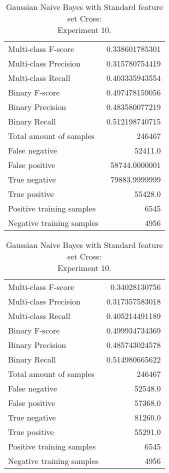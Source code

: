\begin{table}[H]
\begin{minipage}{0.5\textwidth}
\caption{Gaussian Naive Bayes with Standard feature set Cross: \\Experiment 9.}
\centering
\begin{tabular}{l r}
\toprule
Multi-class F-score & 0.338601785301 \\
Multi-class Precision & 0.315780754419 \\
Multi-class Recall & 0.403335943554 \\
\midrule
Binary F-score & 0.497478159056 \\
Binary Precision & 0.483580077219 \\
Binary Recall & 0.512198740715 \\
\midrule
Total amount of samples & 246467 \\
False negative & 52411.0 \\
False positive & 58744.0000001 \\
True negative & 79883.9999999 \\
True positive & 55428.0 \\
\midrule
Positive training samples & 6545 \\
Negative training samples & 4956 \\
\bottomrule
\end{tabular}
\end{minipage}
\hfillx
\begin{minipage}{0.5\textwidth}
\caption{Gaussian Naive Bayes with Standard feature set Cross: \\Experiment 10.}
\centering
\begin{tabular}{l r}
\toprule
Multi-class F-score & 0.34028130756 \\
Multi-class Precision & 0.317357583018 \\
Multi-class Recall & 0.405214491189 \\
\midrule
Binary F-score & 0.499934734369 \\
Binary Precision & 0.485743024578 \\
Binary Recall & 0.514980665622 \\
\midrule
Total amount of samples & 246467 \\
False negative & 52548.0 \\
False positive & 57368.0 \\
True negative & 81260.0 \\
True positive & 55291.0 \\
\midrule
Positive training samples & 6545 \\
Negative training samples & 4956 \\
\bottomrule
\end{tabular}
\end{minipage}
\end{table}
